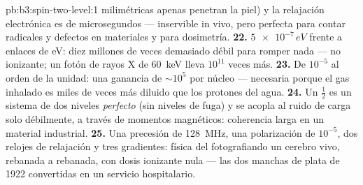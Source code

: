 \begin{solution}{pb:b3:spin-two-level:1}
milimétricas apenas penetran la piel) y la relajación electrónica es de
microsegundos --- inservible in vivo, pero perfecta para contar
radicales y defectos en materiales y para dosimetría.
\textbf{22.} $\num{5e-7}\,\unit{eV}$ frente a enlaces de eV: diez millones
de veces demasiado débil para romper nada --- no ionizante; un
fotón de rayos X de \qty{60}{keV} lleva $10^{11}$ veces más.
\textbf{23.} De $10^{-5}$ al orden de la unidad: una ganancia de
$\sim10^5$ por núcleo --- necesaria porque el gas inhalado es miles de
veces más diluido que los protones del agua.
\textbf{24.} Un  $\tfrac12$ es un sistema de dos niveles
\emph{perfecto} (sin niveles de fuga) y se acopla al ruido de carga solo
débilmente, a través de momentos magnéticos: coherencia larga en un
material industrial.
\textbf{25.} Una precesión de \qty{128}{MHz}, una polarización de $10^{-5}$,
dos relojes de relajación y tres gradientes: física del 
fotografiando un cerebro vivo, rebanada a rebanada, con dosis
ionizante nula --- las dos manchas de plata de 1922 convertidas en un
servicio hospitalario.
\end{solution}
